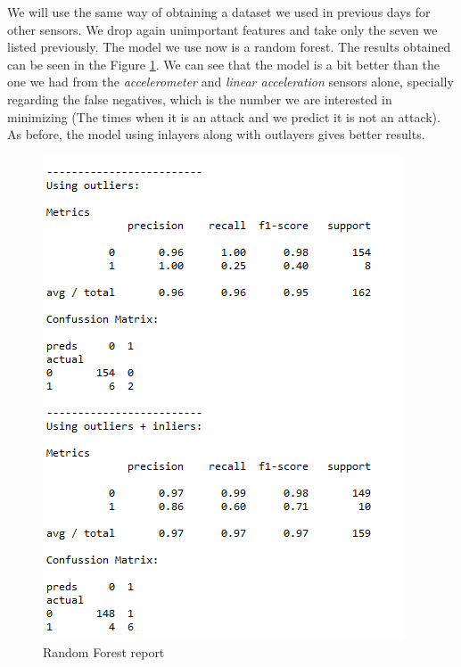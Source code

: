 \documentclass[idxtotoc,hyperref,openany]{labbook} %
\begin{document}

We will use the same way of obtaining a dataset we used in previous days for other sensors. We drop again unimportant features and take only the seven we listed previously. The model we use now is a random forest. The results obtained can be seen in the Figure \ref{random forest Report}. We can see that the model is a bit better than the one we had from the \textit{accelerometer} and \textit{linear acceleration} sensors alone, specially regarding the false negatives, which is the number we are interested in minimizing (The times when it is an attack and we predict it is not an attack). As before, the model using inlayers along with outlayers gives better results.

\begin{figure}[h]
\includegraphics[width=0.9\linewidth]{Milestone3/report_selection.png}
\setlength\belowcaptionskip{-10pt}
\caption{Random Forest report}
\label{random forest Report}
\end{figure}

\end{document}
